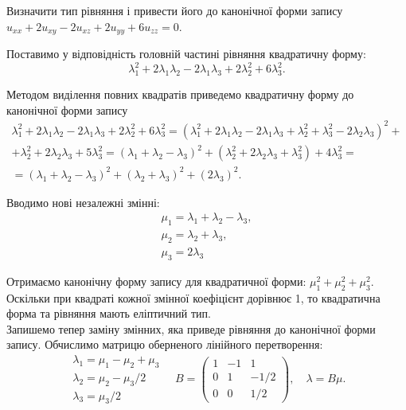 \begin{example}
	Визначити тип рівняння і привести його до канонічної форми запису $u_{xx} + 2 u_{xy} - 2 u_{xz} + 2 u_{yy} + 6 u_{zz} = 0$.
\end{example}

\begin{solution*}
	Поставимо у відповідність головній частині рівняння квадратичну форму: \[\lambda_1^2+2\lambda_1\lambda_2-2\lambda_1\lambda_3+2\lambda_2^2+6\lambda_3^2. \]

	Методом виділення повних квадратів приведемо квадратичну форму до канонічної форми запису
	\begin{multline*}
		\lambda_1^2+2\lambda_1\lambda_2-2\lambda_1\lambda_3+2\lambda_2^2+6\lambda_3^2 = (\lambda_1^2+2\lambda_1\lambda_2-2\lambda_1\lambda_3+\lambda_2^2+\lambda_3^2 - 2 \lambda_2\lambda_3)^2 + \\ 
		+ \lambda_2^2 + 2\lambda_2\lambda_3 + 5\lambda_3^2 = (\lambda_1+\lambda_2-\lambda_3)^2 + (\lambda_2^2 + 2\lambda_2\lambda_3+\lambda_3^2) + 4\lambda_3^2 = \\
		= (\lambda_1+\lambda_2-\lambda_3)^2 + (\lambda_2 + \lambda_3)^2 + (2\lambda_3)^2.
	\end{multline*}

	Вводимо нові незалежні змінні: \[ \begin{matrix} \mu_1 = \lambda_1 + \lambda_2 - \lambda_3, \\ \mu_2 = \lambda_2 + \lambda_3, \\ \mu_3 = 2 \lambda_3 \end{matrix} \]

	Отримаємо канонічну форму запису для квадратичної форми: $\mu_1^2 + \mu_2^2 + \mu_3^2$. \\

	Оскільки при квадраті кожної змінної коефіцієнт дорівнює 1, то квадратична форма та рівняння мають еліптичний тип. \\

	Запишемо тепер заміну змінних, яка приведе рівняння до канонічної форми запису. Обчислимо матрицю оберненого лінійного перетворення:
	\[ \begin{matrix} \lambda_1 = \mu_1 - \mu_2 + \mu_3 \\ \lambda_2 = \mu_2 - \mu_3/2 \\ \lambda_3 = \mu_3 / 2 \end{matrix} \quad B = \begin{pmatrix} 1 & -1 & 1 \\ 0 & 1 & -1/2 \\ 0 & 0 & 1/2 \end{pmatrix}, \quad \lambda = B \mu. \]


\end{solution*}

